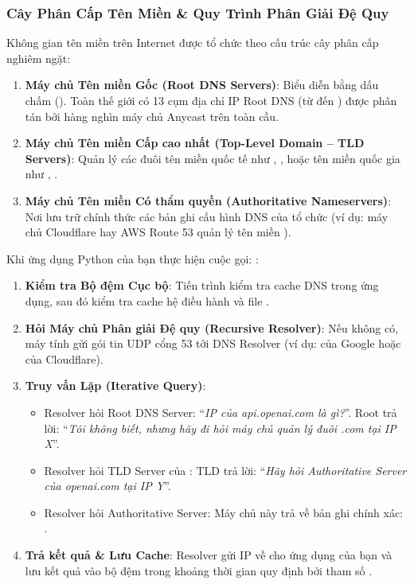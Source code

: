 \subsubsection{Cây Phân Cấp Tên Miền \& Quy Trình Phân Giải Đệ Quy}
Không gian tên miền trên Internet được tổ chức theo cấu trúc cây phân cấp nghiêm ngặt:
\begin{enumerate}
  \item \textbf{Máy chủ Tên miền Gốc (Root DNS Servers)}: Biểu diễn bằng dấu chấm (). Toàn thế giới có 13 cụm địa chỉ IP Root DNS (từ  đến ) được phân tán bởi hàng nghìn máy chủ Anycast trên toàn cầu.
  \item \textbf{Máy chủ Tên miền Cấp cao nhất (Top-Level Domain -- TLD Servers)}: Quản lý các đuôi tên miền quốc tế như , ,  hoặc tên miền quốc gia như , .
  \item \textbf{Máy chủ Tên miền Có thẩm quyền (Authoritative Nameservers)}: Nơi lưu trữ chính thức các bản ghi cấu hình DNS của tổ chức (ví dụ: máy chủ Cloudflare hay AWS Route 53 quản lý tên miền ).
\end{enumerate}

Khi ứng dụng Python của bạn thực hiện cuộc gọi: :
\begin{enumerate}
  \item \textbf{Kiểm tra Bộ đệm Cục bộ}: Tiến trình kiểm tra cache DNS trong ứng dụng, sau đó kiểm tra cache hệ điều hành và file .
  \item \textbf{Hỏi Máy chủ Phân giải Đệ quy (Recursive Resolver)}: Nếu không có, máy tính gửi gói tin UDP cổng 53 tới DNS Resolver (ví dụ:  của Google hoặc  của Cloudflare).
  \item \textbf{Truy vấn Lặp (Iterative Query)}:
    \begin{itemize}
      \item Resolver hỏi Root DNS Server: ``\textit{IP của api.openai.com là gì?}''. Root trả lời: ``\textit{Tôi không biết, nhưng hãy đi hỏi máy chủ quản lý đuôi .com tại IP X}''.
      \item Resolver hỏi TLD Server của : TLD trả lời: ``\textit{Hãy hỏi Authoritative Server của openai.com tại IP Y}''.
      \item Resolver hỏi Authoritative Server: Máy chủ này trả về bản ghi chính xác: .
    \end{itemize}
  \item \textbf{Trả kết quả \& Lưu Cache}: Resolver gửi IP về cho ứng dụng của bạn và lưu kết quả vào bộ đệm trong khoảng thời gian quy định bởi tham số .
\end{enumerate}


